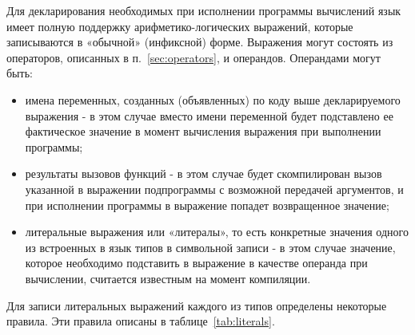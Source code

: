 Для декларирования необходимых при исполнении программы вычислений язык имеет полную поддержку арифметико-логических выражений, которые записываются в «обычной» (инфиксной) форме.
Выражения могут состоять из операторов, описанных в п.~\ref{sec:operators}, и операндов.
Операндами могут быть:

\begin{itemize}
    \item имена переменных, созданных (объявленных) по коду выше декларируемого выражения - в этом случае вместо имени переменной будет подставлено ее фактическое значение в момент вычисления выражения при выполнении программы;
    \item результаты вызовов функций - в этом случае будет скомпилирован вызов указанной в выражении подпрограммы с возможной передачей аргументов, и при исполнении программы в выражение попадет возвращенное значение;
    \item литеральные выражения или «литералы», то есть конкретные значения одного из встроенных в язык типов в символьной записи - в этом случае значение, которое необходимо подставить в выражение в качестве операнда при вычислении, считается известным на момент компиляции.
\end{itemize}

Для записи литеральных выражений каждого из типов определены некоторые правила.
Эти правила описаны в таблице~\ref{tab:literals}.

